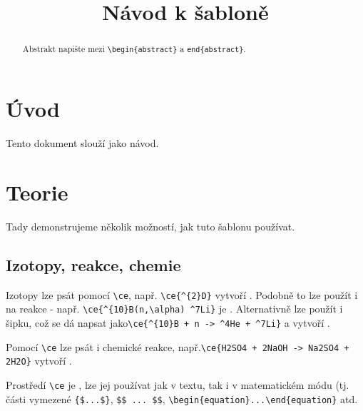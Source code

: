 \documentclass{cygclanek}
\begin{document}
\title{Návod k šabloně}



\maketitle
\begin{abstract}
    Abstrakt napište mezi \verb|\begin{abstract}| a \verb|end{abstract}|.
\end{abstract}

\section{Úvod}

Tento dokument slouží jako návod. 

\section{Teorie}
Tady demonstrujeme několik možností, jak tuto šablonu používat.

\subsection{Izotopy, reakce, chemie}
Izotopy lze psát pomocí \verb|\ce|, např. \verb|\ce{^{2}D}| vytvoří . Podobně to lze použít i na 
reakce - např. \verb|\ce{^{10}B(n,\alpha) ^7Li}| je . Alternativně lze 
použít i šipku, což se dá napsat jako\newline\verb|\ce{^{10}B + n -> ^4He + ^7Li}| 
a vytvoří . 

Pomocí \verb|\ce| lze psát i chemické reakce, např.\verb|\ce{H2SO4 + 2NaOH -> Na2SO4 + 2H2O}| vytvoří .

    Prostředí \verb|\ce| je , lze jej používat jak v textu, tak i v matematickém módu 
    (tj. části vymezené \verb|{$...$}|, \verb|$$ ... $$|, \verb|\begin{equation}...\end{equation}| atd.
\end{document}
